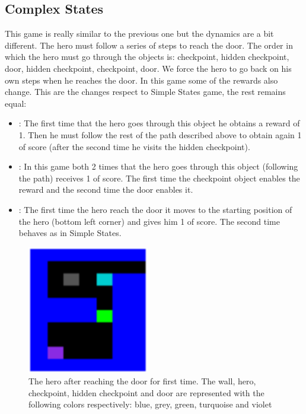 \subsection{Complex States\label{subsec:ComplexStates}}
This game is really similar to the previous one but the dynamics are a bit different.
The hero must follow a series of steps to reach the door.
The order in which the hero must go through the objects is: checkpoint, hidden checkpoint, door, hidden checkpoint,
checkpoint, door.
We force the hero to go back on his own steps when he reaches the door.
In this game some of the rewards also change.
This are the changes respect to Simple States game, the rest remains equal:
\begin{itemize}
    \item {}: The first time that the hero goes through this object he obtains a reward of 1.
    Then he must follow the rest of the path described above to obtain again 1 of score (after the second time he visits the hidden checkpoint).
    \item {}: In this game both 2 times that the hero goes through this object
    (following the path) receives 1 of score.
    The first time the checkpoint object enables the reward and the second time the door enables it.
    \item {}: The first time the hero reach the door it moves to the starting position of the hero (bottom left corner)
    and gives him 1 of score.
    The second time behaves as in Simple States.
\end{itemize}

\begin{figure}[hbtp]
\begin{center}
\includegraphics[width=200]{img/ComplexStates_going_back.png}
\end{center}
\caption[Complex States game]
{The hero after reaching the door for first time. The wall, hero, checkpoint, hidden checkpoint
and door are represented with the following colors respectively: blue, grey, green, turquoise and violet}
\label{fig:ComplexStates}
\end{figure}


